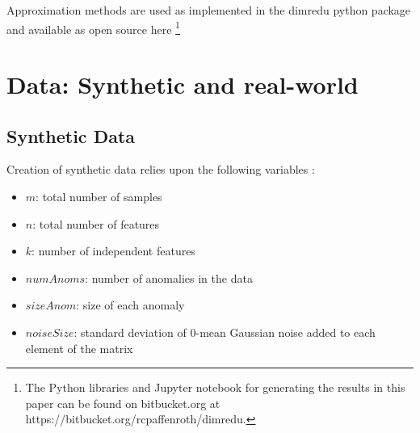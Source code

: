 \documentclass[conference]{IEEEtran}
\begin{document}
Approximation methods are used as implemented in the dimredu python package and available as open source here
\footnote{The Python libraries and Jupyter notebook for generating the results in this paper can be found on bitbucket.org at  https://bitbucket.org/rcpaffenroth/dimredu. %
}

\section{Data: Synthetic and real-world}

\subsection{Synthetic Data}

Creation of synthetic data relies upon the following variables :
\begin{itemize}
\item $m$: total number of samples
\item $n$: total number of features 
\item $k$: number of independent features
\item $numAnoms$: number of anomalies in the data
\item $sizeAnom$: size of each anomaly
\item $noiseSize$: standard deviation of $0$-mean Gaussian noise added to each element of the matrix 
\end{itemize}
\end{document}
